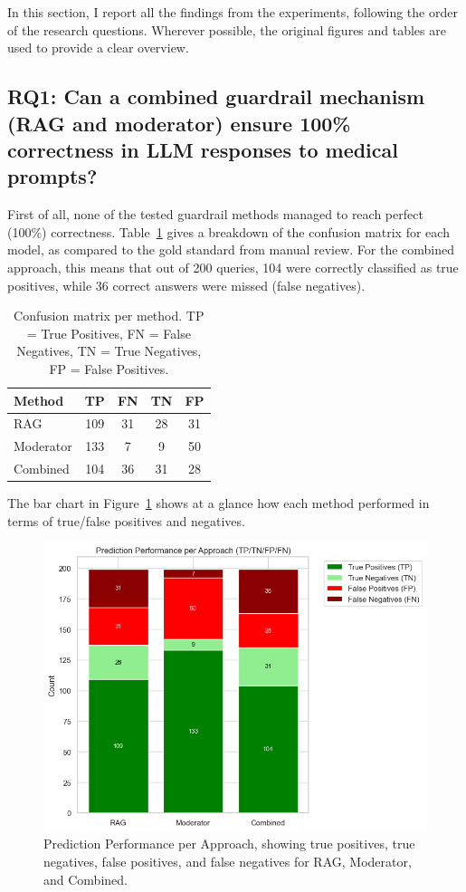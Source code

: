 In this section, I report all the findings from the experiments, following the order of the research questions. Wherever possible, the original figures and tables are used to provide a clear overview.

\subsection{RQ1: Can a combined guardrail mechanism (RAG and moderator) ensure 100\% correctness in LLM responses to medical prompts?}

First of all, none of the tested guardrail methods managed to reach perfect (100\%) correctness. Table~\ref{tab:confusionmatrix} gives a breakdown of the confusion matrix for each model, as compared to the gold standard from manual review. For the combined approach, this means that out of 200 queries, 104 were correctly classified as true positives, while 36 correct answers were missed (false negatives).

\begin{table}[H]
\centering
\caption{Confusion matrix per method. TP = True Positives, FN = False Negatives, TN = True Negatives, FP = False Positives.}
\label{tab:confusionmatrix}
\begin{tabular}{lcccc}
\toprule
Method & TP & FN & TN & FP \\
\midrule
RAG        & 109 & 31 & 28 & 31 \\
Moderator  & 133 & 7  & 9  & 50 \\
Combined   & 104 & 36 & 31 & 28 \\
\bottomrule
\end{tabular}
\end{table}

The bar chart in Figure~\ref{fig:prediction_performance_bar} shows at a glance how each method performed in terms of true/false positives and negatives.

\begin{figure}[H]
  \centering
  \includegraphics[width=0.95\linewidth]{figures/prediction_performance_per_approach.png}
  \caption{Prediction Performance per Approach, showing true positives, true negatives, false positives, and false negatives for RAG, Moderator, and Combined.}
  \label{fig:prediction_performance_bar}
\end{figure}

